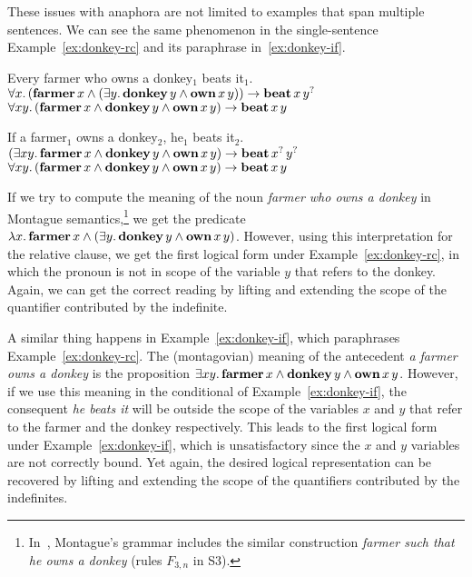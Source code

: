 These issues with anaphora are not limited to examples that span multiple
sentences. We can see the same phenomenon in the single-sentence
Example~\ref{ex:donkey-rc} and its paraphrase in~\ref{ex:donkey-if}.

\begin{exe}
  \ex Every farmer who owns a donkey$_1$ beats it$_1$. \label{ex:donkey-rc} \\
  $\forall x.\, (\textbf{farmer}\,x \land (\exists y.\,
  \textbf{donkey}\,y \land \textbf{own}\,x\,y)) \to
  \textbf{beat}\,x\,y^?$ \\
  $\forall x y.\, (\textbf{farmer}\,x \land \textbf{donkey}\,y \land
  \textbf{own}\,x\,y) \to \textbf{beat}\,x\,y$

  \ex If a farmer$_1$ owns a donkey$_2$, he$_1$ beats it$_2$. \label{ex:donkey-if} \\
  $(\exists x y.\, \textbf{farmer}\,x \land \textbf{donkey}\,y \land \textbf{own}\,x\,y) \to \textbf{beat}\,x^?\,y^?$ \\
  $\forall x y.\, (\textbf{farmer}\,x \land \textbf{donkey}\,y \land
  \textbf{own}\,x\,y) \to \textbf{beat}\,x\,y$
\end{exe}

If we try to compute the meaning of the noun \emph{farmer who owns a
  donkey} in Montague semantics,\footnote{In~\cite{montague1973proper},
  Montague's grammar includes the similar construction \emph{farmer such
    that he owns a donkey} (rules $F_{3,n}$ in S3).} we get the predicate
$\lambda x.\, \textbf{farmer}\,x \land (\exists y.\, \textbf{donkey}\,y
  \land \textbf{own}\,x\,y)$. However, using this interpretation for
the relative clause, we get the first logical form under
Example~\ref{ex:donkey-rc}, in which the pronoun is not in scope of the
variable $y$ that refers to the donkey. Again, we can get the correct
reading by lifting and extending the scope of the quantifier contributed by
the indefinite.

A similar thing happens in Example~\ref{ex:donkey-if}, which paraphrases
Example~\ref{ex:donkey-rc}. The (montagovian) meaning of the antecedent
\emph{a farmer owns a donkey} is the proposition
$\exists x y.\, \textbf{farmer}\,x \land \textbf{donkey}\,y \land
\textbf{own}\,x\,y$. However, if we use this meaning in the conditional
of Example~\ref{ex:donkey-if}, the consequent \emph{he beats it} will be
outside the scope of the variables $x$ and $y$ that refer to the farmer and
the donkey respectively. This leads to the first logical form under
Example~\ref{ex:donkey-if}, which is unsatisfactory since the $x$ and $y$
variables are not correctly bound. Yet again, the desired logical
representation can be recovered by lifting and extending the scope of the
quantifiers contributed by the indefinites.

